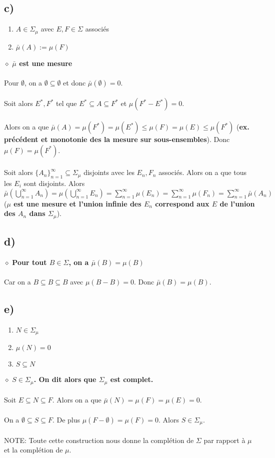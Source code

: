 \documentclass[a4paper,10pt]{article}
\begin{document}
\subsection*{c)}
\begin{enumerate}
	\item $A \in \Sigma_\mu$ avec $E,F \in \Sigma$ associés
	\item $\bar{\mu} (A) := \mu(F)$
\end{enumerate}
$\diamond$ \textbf{$\bar{\mu}$ est une mesure}
\\
\\
Pour $\emptyset$, on a $\emptyset \subseteq \emptyset$ et donc $\bar{\mu} (\emptyset) = 0$.
\\
\\
Soit alors $E^*, F^*$ tel que $E^* \subseteq A \subseteq F^*$ et $\mu(F^* - E^*) = 0$.
\\
\\
Alors on a que $\bar{\mu}(A) = \mu (F^*) = \mu (E^*) \leq \mu (F) = \mu (E) \leq \mu (F^*)$ (\textbf{ex. précédent et monotonie des la mesure sur sous-ensembles}). Donc $\mu (F) = \mu (F^*)$.
\\
\\
Soit alors $\{A_n\}_{n=1}^\infty \subseteq \Sigma_\mu$ disjoints avec les $E_n, F_n$ associés. Alors on a que tous les $E_i$ sont disjoints. Alors $\bar{\mu}(\bigcup_{n=1}^\infty A_n) = \mu(\bigcup_{n=1}^\infty E_n) = \sum_{n=1}^\infty \mu(E_n) = \sum_{n=1}^\infty \mu (F_n) = \sum_{n=1}^\infty \bar{\mu}(A_n)$ (\textbf{$\mu$ est une mesure et l'union infinie des $E_n$ correspond aux $E$ de l'union des $A_n$ dans $\Sigma_\mu$}).  

\subsection*{d)}
$\diamond$ \textbf{Pour tout $B \in \Sigma$, on a $\bar{\mu} (B) = \mu (B)$}
\\
\\
Car on a $B \subseteq B \subseteq B$ avec $\mu (B - B) = 0$. Donc $\bar{\mu} (B) = \mu (B)$.

\subsection*{e)}
\begin{enumerate}
	\item $N \in \Sigma_\mu$
	\item $\mu(N) = 0$
	\item $S \subseteq N$
\end{enumerate}
$\diamond$ \textbf{$S \in \Sigma_\mu$. On dit alors que $\Sigma_\mu$ est complet.}
\\
\\
Soit $E \subseteq N \subseteq F$. Alors on a que $\bar{\mu}(N) = \mu (F) = \mu (E) = 0$.
\\
\\
On a $\emptyset \subseteq S \subseteq F$. De plus $\mu (F - \emptyset) = \mu (F) = 0$. Alors $S \in \Sigma_\mu$.
\\
\\
NOTE: Toute cette construction nous donne la complétion de $\Sigma$ par rapport à $\mu$ et la complétion de $\mu$.
\end{document}
